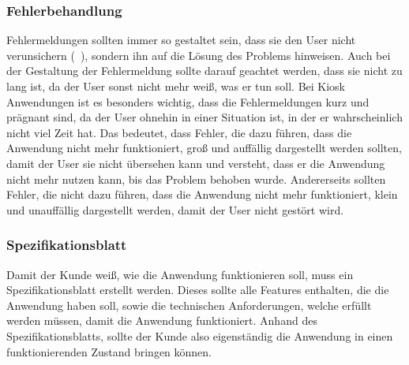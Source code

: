 \subsubsection{Fehlerbehandlung}\label{subsubsec:fehlerbehandlung}
Fehlermeldungen sollten immer so gestaltet sein, dass sie den User nicht verunsichern (~\cite{interaction-design-book1}), sondern ihn auf die Lösung des Problems hinweisen.
Auch bei der Gestaltung der Fehlermeldung sollte darauf geachtet werden, dass sie nicht zu lang ist, da der User sonst nicht mehr weiß, was er tun soll.
Bei Kiosk Anwendungen ist es besonders wichtig, dass die Fehlermeldungen kurz und prägnant sind, da der User ohnehin in einer Situation ist, in der er wahrscheinlich nicht viel Zeit hat.
Das bedeutet, dass Fehler, die dazu führen, dass die Anwendung nicht mehr funktioniert, groß und auffällig dargestellt werden sollten, damit der User sie nicht übersehen kann und versteht, dass er die Anwendung nicht mehr nutzen kann, bis das Problem behoben wurde.
Andererseits sollten Fehler, die nicht dazu führen, dass die Anwendung nicht mehr funktioniert, klein und unauffällig dargestellt werden, damit der User nicht gestört wird.
\subsubsection{Spezifikationsblatt}\label{subsubsec:spezifikationsblatt}
Damit der Kunde weiß, wie die Anwendung funktionieren soll, muss ein Spezifikationsblatt erstellt werden.
Dieses sollte alle Features enthalten, die die Anwendung haben soll, sowie die technischen Anforderungen, welche erfüllt werden müssen, damit die Anwendung funktioniert.
Anhand des Spezifikationsblatts, sollte der Kunde also eigenständig die Anwendung in einen funktionierenden Zustand bringen können.
